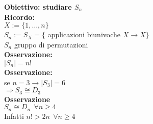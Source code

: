 \documentclass[12px]{article}
\begin{document}
	  \textbf{Obiettivo: studiare $S_n$}\\
	  \textbf{Ricordo:}\\
	  $X:=\{1,\ldots,n\}$\\
	  $S_n:=S_X= \{$ applicazioni biunivoche $X \rightarrow X\}$\\
	  $S_n$ gruppo di permutazioni\\
	   \textbf{Osservazione:}\\
	   $|S_n| = n!$\\
	   \textbf{Osservazione:}\\
	   se $n=3 \rightarrow |S_3| = 6$\\
	   $ \Rightarrow S_3 \cong D_3$ \\
	   \textbf{Osservazione}\\
	   $S_n\cong D_n \ \ \forall n\geq 4$\\
	   Infatti  $n! > 2n \ \ \forall n\geq 4$ 
\end{document}
